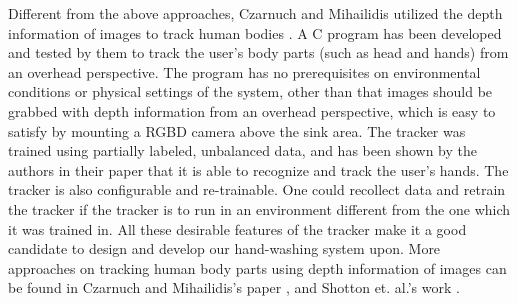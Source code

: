 Different from the above approaches, Czarnuch and Mihailidis utilized the depth information of images to track human bodies \cite{czarnuch2014}. A C program has been developed and tested by them to track the user's body parts (such as head and hands) from an overhead perspective. The program has no prerequisites on environmental conditions or physical settings of the system, other than that images should be grabbed with depth information from an overhead perspective, which is easy to satisfy by mounting a RGBD camera above the sink area. The tracker was trained using partially labeled, unbalanced data, and has been shown by the authors in their paper that it is able to recognize and track the user's hands. The tracker is also configurable and re-trainable. One could recollect data and retrain the tracker if the tracker is to run in an environment different from the one which it was trained in. All these desirable features of the tracker make it a good candidate to design and develop our hand-washing system upon. More approaches on tracking human body parts using depth information of images can be found in Czarnuch and Mihailidis's paper \cite{czarnuch2014}, and Shotton et. al.'s work \cite{shotton2013real}.
